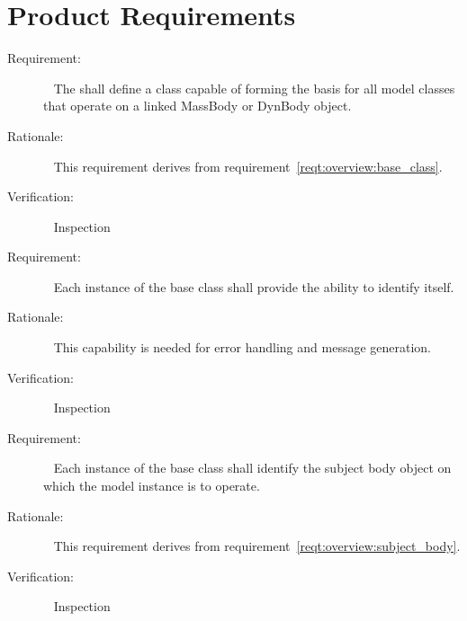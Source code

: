 %

\chapter{Product Requirements}\label{ch:\modelpartid:reqt}


\label{reqt:BodyAction:base_class}
\begin{description}
\item[Requirement:]\ \newline
  The \ModelDesc shall define a class capable of forming the
  basis for all model classes that operate on a linked MassBody or DynBody object.
\item[Rationale:]\ \newline
  This requirement derives from requirement~\ref{reqt:overview:base_class}.
\item[Verification:]\ \newline
  Inspection
\end{description}

\label{reqt:BodyAction:self_identification}
\begin{description}
\item[Requirement:]\ \newline
  Each instance of the \ModelDesc base class shall
  provide the ability to identify itself.
\item[Rationale:]\ \newline
  This capability is needed for error handling and message generation.
\item[Verification:]\ \newline
  Inspection
\end{description}

\label{reqt:BodyAction:subject_body}
\begin{description}
\item[Requirement:]\ \newline
  Each instance of the \ModelDesc base class shall
  identify the subject body object
  on which the model instance is to operate.
\item[Rationale:]\ \newline
  This requirement derives from requirement~\ref{reqt:overview:subject_body}.
\item[Verification:]\ \newline
  Inspection
\end{description}

